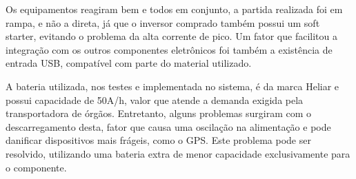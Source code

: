 Os equipamentos reagiram bem e todos em conjunto, a partida realizada foi em rampa, e não a direta, já que o inversor comprado também possui um soft starter, evitando o problema da alta corrente de pico. Um fator que facilitou a integração com os outros componentes eletrônicos foi também a existência de entrada USB, compatível com parte do material utilizado.

A bateria utilizada, nos testes e implementada no sistema, é da marca Heliar e possui  capacidade de 50A/h, valor que atende a demanda exigida pela transportadora de órgãos. Entretanto, alguns problemas surgiram com o descarregamento desta, fator que causa uma oscilação na alimentação e pode danificar dispositivos mais frágeis, como o GPS. Este problema pode ser resolvido, utilizando uma bateria extra de menor capacidade exclusivamente para o componente.

